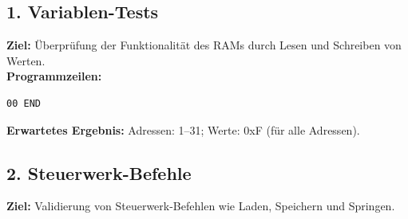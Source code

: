 \subsection{1. Variablen-Tests}
\noindent\textbf{Ziel:} Überprüfung der Funktionalität des RAMs durch Lesen und Schreiben von Werten. \\
\textbf{Programmzeilen:}
\begin{verbatim}
00 END
\end{verbatim}
\textbf{Erwartetes Ergebnis:} Adressen: 1--31; Werte: 0xF (für alle Adressen).

\begin{table}[H]
    \centering
    \caption{Testfall für Variablen-Tests}
\end{table}

\clearpage
\subsection{2. Steuerwerk-Befehle}
\noindent\textbf{Ziel:} Validierung von Steuerwerk-Befehlen wie Laden, Speichern und Springen. \\


